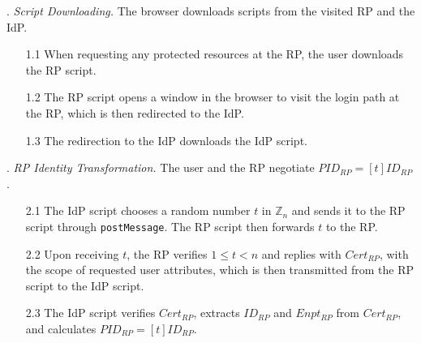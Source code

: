 \vspace{1mm}
. {\em Script Downloading.}
The browser downloads scripts from the visited RP and the IdP.
\vspace{-\topsep}
\begin{itemize}
\setlength{\topsep}{0pt}
\setlength{\partopsep}{0pt}
\setlength{\itemsep}{0pt}
\setlength{\parsep}{0pt}
\setlength{\parskip}{0pt}
\item[1.1]
When requesting any protected resources at the RP, the user downloads the RP script.
\item[1.2]
The RP script opens a window in the browser to visit the login path at the RP, which is then redirected to the IdP.
\item[1.3]
The redirection to the IdP downloads the IdP script.
\end{itemize}



. {\em RP Identity Transformation.}
The user and the RP negotiate $PID_{RP} = [t]{ID_{RP}}$.
\vspace{-\topsep}
\begin{itemize}
\setlength{\topsep}{0pt}
\setlength{\partopsep}{0pt}
\setlength{\itemsep}{0pt}
\setlength{\parsep}{0pt}
\setlength{\parskip}{0pt}
\item[2.1] The IdP script chooses a random number $t$ in $\mathbb{Z}_n$ and sends it to the RP script through \verb+postMessage+. The RP script then forwards $t$ to the RP.
\item[2.2] Upon receiving $t$, the RP verifies $1 \leq t < n$ and %
 replies with $Cert_{RP}$,
    with the scope of requested user attributes,
    which is then transmitted from the RP script to the IdP script.  %
\item[2.3] The IdP script verifies $Cert_{RP}$, extracts $ID_{RP}$ and $Enpt_{RP}$ from $Cert_{RP}$, and calculates $PID_{RP}=[t]{ID_{RP}}$.

\end{itemize}



